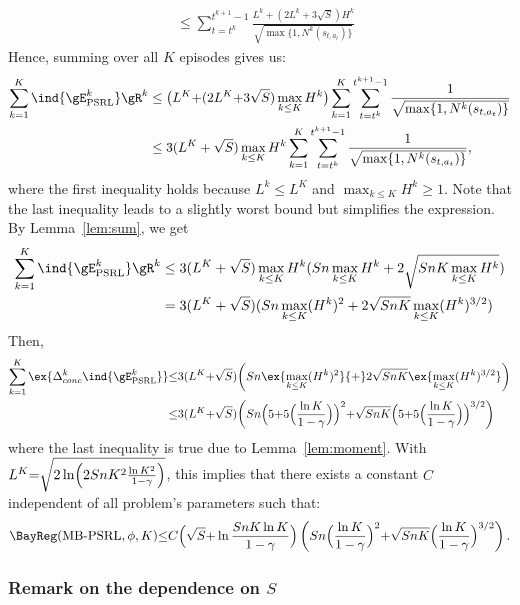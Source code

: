 \begin{subappendices}
\begin{align}
    &\le \sum_{t=t^k}^{t^{k+1}-1} \frac{L^{k}{+}(2L^{k} {+}3\sqrt{S})H^k}{\sqrt{\max\{1,N^{k}(s_{t,a_t})\} }} \label{eq:PSRL_R_k}
\end{align}
Hence, summing over all $K$ episodes gives us:
\begin{align}
    \sum_{k=1}^{K} \ind{\gE^{k}_\text{PSRL}}\gR^k
    &\le  \big(L^K {+}(2L^K {+}3\sqrt{S})\max_{k\le K}H^k\big)\sum_{k=1}^K \sum_{t=t^k}^{t^{k+1}-1}\frac1{\sqrt{\max\{1,N^{k}(s_{t,a_t})\} }}
    \nonumber\\
    &\le  3(L^K+\sqrt{S})\max_{k\le K}H^k \sum_{k=1}^K \sum_{t=t^k}^{t^{k+1}-1}\frac1{\sqrt{\max\{1,N^{k}(s_{t,a_t})\} }},
    \label{eq:sum_not_E_k}
\end{align}
where the first inequality holds because $L^k\le L^K$ and $\max_{k\le K}H^k\ge1$. Note that the last inequality leads to a slightly worst bound but simplifies the expression. By Lemma~\ref{lem:sum}, we get
\begin{align*}
    \sum_{k=1}^{K} \ind{\gE^{k}_\text{PSRL}}\gR^k
    &\le 3(L^K+\sqrt{S})\max_{k\le K}H^k(Sn\max_{k\le K}H^k +2\sqrt{SnK \max_{k\le K}H^k}) \\
    &=3(L^K+\sqrt{S})(Sn\max_{k\le K}(H^k)^2 +2\sqrt{SnK} \max_{k\le K}(H^k)^{3/2})
    \nonumber
\end{align*}
Then, 
\begin{align}
    \sum_{k=1}^K\ex{\Delta^k_{conc} \ind{\gE^{k}_\text{PSRL}}}
    &{\le} 3(L^K {+}\sqrt{S})\bigg(Sn\ex{\max_{k\le K}(H^k)^2} {+}2\sqrt{SnK} \ex{\max_{k\le K}(H^k)^{3/2}}\bigg) \label{eq:proof_bound}\\
    &{\le} 3(L^K {+}\sqrt{S})\bigg(Sn\Bigl(5 {+}5\Bigl(\frac{\ln K}{1-\gamma}\Bigr)\Bigr)^2 {+}\sqrt{SnK}\Bigl(5 {+}5\Bigl(\frac{\ln K}{1-\gamma}\Bigr)\Bigr)^{3/2}\bigg) \nonumber
\end{align}
where the last inequality is true due to Lemma~\ref{lem:moment}.
With $L^K{=}\sqrt{2\ln\Bigl(2SnK^2\frac{\ln K^2}{1-\gamma}\Bigr)}$, this implies that there exists a constant $C$ independent of all problem's parameters such that:
\begin{align*}
    \BayReg(\textnormal{MB-PSRL},\phi,K) {\le} C\Bigl(\sqrt{S}{+}\ln \frac{SnK\ln K}{1-\gamma}\Bigr) \left(Sn\Bigl(\frac{\ln K}{1-\gamma}\Bigr)^{2}
    {+}\sqrt{SnK}\Bigl(\frac{\ln K}{1-\gamma}\Bigr)^{3/2}\right).
\end{align*}

\subsubsection{Remark on the dependence on $S$}
\label{sssec:psrl_s}


\end{subappendices}
